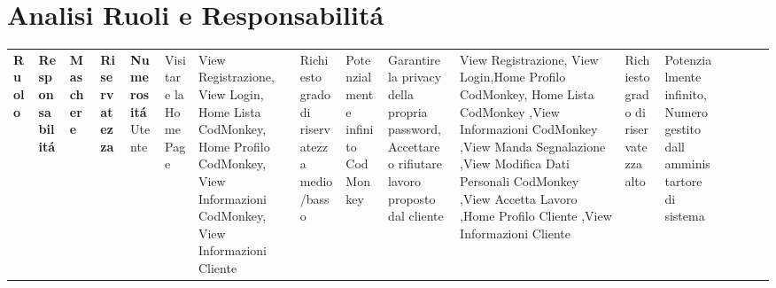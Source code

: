 \section{Analisi Ruoli e Responsabilitá}

\begin{center}


    \begin{tabularx}
       {\textwidth} {|X|X|X|X|X|}
        \hline  {}
        \n      {}
        \large \textbf{Ruolo} & \centering\large\textbf{Responsabilitá} & \large\textbf{Maschere} & \centering\large\textbf{Riservatezza} & \centering\large\textbf{Numerositá}
        \n        Utente            &           Visitare la HomePage                 &           View Registrazione, View Login, Home Lista CodMonkey, Home Profilo CodMonkey,  View Informazioni CodMonkey, View Informazioni Cliente      &           Richiesto grado di riservatezza medio/basso                            &   Potenzialmente infinito
        \n       CodMonkey            &                Garantire la  privacy della propria password, \newline Accettare o rifiutare lavoro proposto dal cliente                       &           View Registrazione, View Login,Home Profilo CodMonkey, Home Lista CodMonkey ,View Informazioni CodMonkey ,View Manda Segnalazione ,View Modifica Dati Personali CodMonkey    ,View Accetta Lavoro  ,Home Profilo Cliente ,View Informazioni Cliente      &     Richiesto grado di riservatezza alto                      & Potenzialmente infinito, Numero gestito \newline dall amministartore di sistema
        \n
    \end{tabularx}
    \label{tab:monkeytable:problema:tabellaRuoli}


\end{center}
